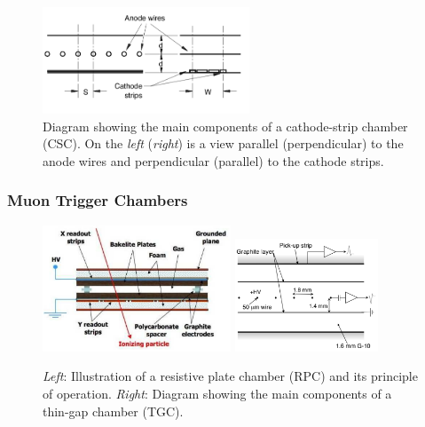 \begin{figure}[!htb]
    \begin{center}
        \includegraphics[width=0.55\textwidth]{figures/chapter2/muon_spec/csc_chamber}
        \caption{
            Diagram showing the main components of a cathode-strip chamber (CSC).
            On the \textit{left} (\textit{right}) is a view parallel (perpendicular) to the anode
            wires and perpendicular (parallel) to the cathode strips.
        }
        \label{fig:csc_chamber}
    \end{center}
\end{figure}

\subsubsection{Muon Trigger Chambers}
\label{sec:muon_trigger}

\begin{figure}[!htb]
    \begin{center}
        \includegraphics[width=0.5\textwidth]{figures/chapter2/muon_spec/rpc_chamber}
        \includegraphics[width=0.38\textwidth]{figures/chapter2/muon_spec/tgc_chamber}
        \caption{
            \textit{Left}: Illustration of a resistive plate chamber (RPC) and its principle of operation.
            \textit{Right}: Diagram showing the main components of a thin-gap chamber (TGC).
        }
        \label{fig:muon_trigger_chamber}
    \end{center}
\end{figure}
